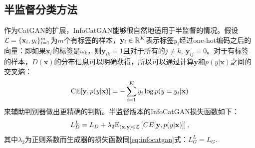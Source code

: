 \subsection{半监督分类方法}\label{sec:ss-infocatgan}
作为CatGAN的扩展，InfoCatGAN能够很自然地适用于半监督的情况。假设$\mathcal{L} = \{\mathbf{x}_i, y_i\}_{i=1}^m$为$m$个有标签的样本，$\mathbf{y}_i \in \mathbb{R}^K$表示标签$y_i$经过one-hot编码之后的向量：即如果$\mathbf{x}_i$的标签是$\omega_k$，则$\mathbf{y}_{ik}=1$且对于所有的$j\neq k,~\mathbf{y}_{ij} = 0$。对于有标签的样本，$D(\mathbf{x})$的分布信息可以明确获得，所以可以通过计算$\mathbf{y}$和$p(y|\mathbf{x})$之间的交叉熵：
\begin{equation}
  \label{eq:celoss}
  \text{CE}[\mathbf{y}, p(y|\mathbf{x})] = -\sum_{i=1}^K y_i \log p(y=y_i | \mathbf{x})
\end{equation}
来辅助判别器做出更精确的判断。半监督版本的InfoCatGAN损失函数如下：
\begin{equation}
  L_D^L = L_D + \lambda_2 \text{E}_{(\mathbf{x}, \mathbf{y}) \in \mathcal{L}}\left[ CE[\mathbf{y}, p(y|\mathbf{x})] \right],
\end{equation}
其中$\lambda_2$为正则系数而生成器的损失函数同\eqref{eq:infocatgan}式：$L_G^L = L_G$.

